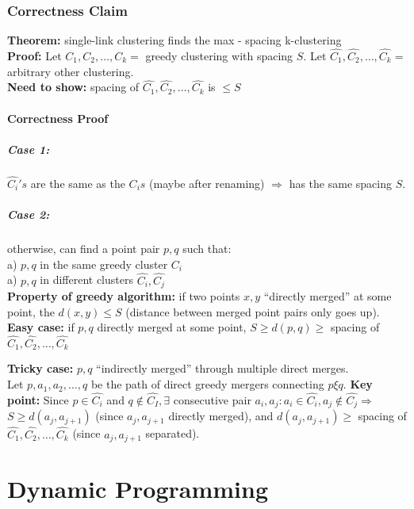 \documentclass{scrartcl}
\begin{document}
\subsubsection{Correctness Claim}
\label{sec:8-2}
{\bf Theorem: } single-link clustering finds the max - spacing k-clustering\\
{\bf Proof: } Let $C_1, C_2, \dots, C_k = $ greedy clustering with spacing $S$.
Let $\hat{C_1}, \hat{C_2}, \dots, \hat{C_k} = $ arbitrary other clustering.\\
{\bf Need to show: } spacing of $\hat{C_1}, \hat{C_2}, \dots, \hat{C_k}$ is
$\leq S$

\paragraph{Correctness Proof}

\subparagraph{Case 1:}
$\hat{C_i}'s$ are the same as the $C_is$ (maybe after renaming) $\Rightarrow$
has the same spacing $S$.

\subparagraph{Case 2:}
otherwise, can find a point pair $p, q$ such that:\\
a) $p, q$ in the same greedy cluster $C_i$\\
a) $p, q$ in different clusters $\hat{C_i}, \hat{C_j}$\\

{\bf Property of greedy algorithm: } if two points $x, y$ ``directly merged'' at
some point, the $d(x, y) \leq S$ (distance between merged point pairs only goes
up). \\

{\bf Easy case: } if $p,q$ directly merged at some point, $S \geq d(p,q) \geq$
spacing of $\hat{C_1}, \hat{C_2}, \dots, \hat{C_k}$

{\bf Tricky case: } $p,q$ ``indirectly merged'' through multiple direct
merges.\\
Let $p, a_1, a_2, \dots, q$ be the path of direct greedy mergers connecting $p
\xi q$. {\bf Key point: } Since $p \in \hat{C_i}$ and $q \notin \hat{C_I}, \exists$
consecutive pair $a_i, a_j: a_i \in \hat{C_i}, a_j \notin \hat{C_j} \Rightarrow$
$S \geq d(a_j, a_{j+1})$ (since $a_j, a_{j+1}$ directly merged), and
$d(a_j, a_{j+1}) \geq $ spacing of $\hat{C_1}, \hat{C_2}, \dots, \hat{C_k}$ 
 (since $a_j, a_{j+1}$ separated).

\section{Dynamic Programming}
\label{sec:8-1}
\end{document}
